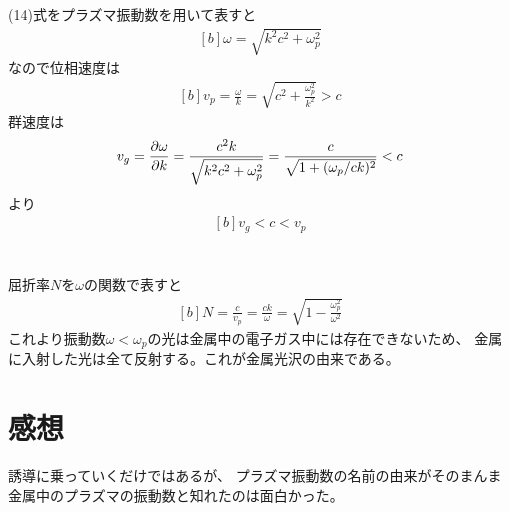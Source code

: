 \documentclass[../ap_2009.tex]{subfiles}
\begin{document}
\section{}
(14)式をプラズマ振動数を用いて表すと
\begin{equation}\begin{aligned}[b]
    \omega =\sqrt{k^2c^2+\omega_p^2}
\end{aligned}\end{equation}
なので位相速度は
\begin{equation}\begin{aligned}[b]
    v_p = \frac{\omega}{k} = \sqrt{c^2+\frac{\omega_p^2}{k^2}} > c
\end{aligned}\end{equation}
群速度は
\begin{equation}\begin{aligned}[b]
    v_g = \pdv{\omega}{k} = \frac{c^2k}{\sqrt{k^2c^2+\omega_p^2}} = \frac{c}{\sqrt{1+(\omega_p/ck)^2}}<c
\end{aligned}\end{equation}
より
\begin{equation}\begin{aligned}[b]
    v_g < c < v_p
\end{aligned}\end{equation}

\section{}
屈折率\(N\)を\(\omega\)の関数で表すと
\begin{equation}\begin{aligned}[b]
    N = \frac{c}{v_p} = \frac{ck}{\omega}=\sqrt{1-\frac{\omega_p^2}{\omega^2}}
\end{aligned}\end{equation}
これより振動数\(\omega<\omega_p\)の光は金属中の電子ガス中には存在できないため、
金属に入射した光は全て反射する。これが金属光沢の由来である。

\section*{感想}
誘導に乗っていくだけではあるが、
プラズマ振動数の名前の由来がそのまんま金属中のプラズマの振動数と知れたのは面白かった。
\end{document}
